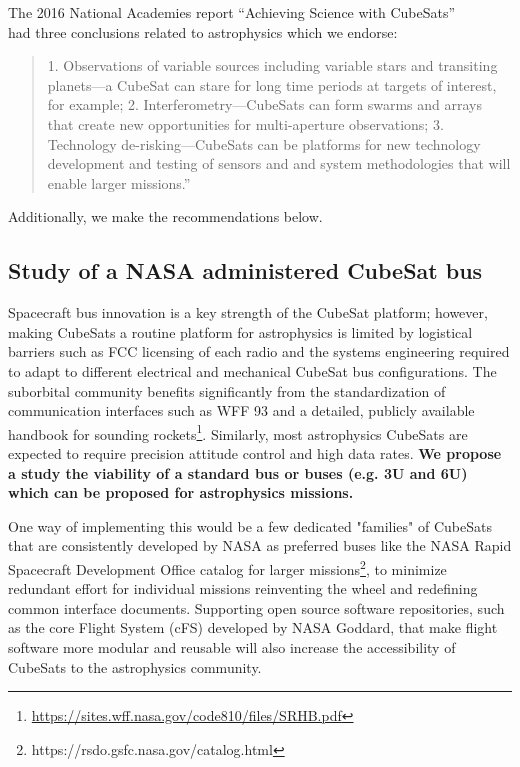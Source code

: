 \documentclass[12pt]{article}
\begin{document}
The 2016 National Academies report ``Achieving Science with CubeSats''\\ \cite{national_academies_of_sciences_achieving_2016}  had three conclusions related to astrophysics which we endorse: 
\begin{quote}
    
1. Observations of variable sources including variable stars and transiting planets—a CubeSat can stare for long time periods at targets of interest, for example; 2. Interferometry—CubeSats can form swarms and arrays that create new opportunities for multi-aperture observations; 3. Technology de-risking—CubeSats can be platforms for new technology development and testing of sensors and and system methodologies that will enable larger missions.''
\end{quote}



Additionally, we make the recommendations below.

\subsection{Study of a NASA administered CubeSat bus}
Spacecraft bus innovation is a key strength of the CubeSat platform; however, making CubeSats a routine platform for astrophysics is limited by logistical barriers such as FCC licensing of each radio and the systems engineering required to adapt to different electrical and mechanical CubeSat bus configurations.  The suborbital community benefits significantly from the standardization of communication interfaces such as WFF 93 and a detailed, publicly available handbook for sounding rockets\footnote{\url{https://sites.wff.nasa.gov/code810/files/SRHB.pdf}}. 
Similarly, most astrophysics CubeSats are expected to require precision attitude control and high data rates.
\textbf{We propose a study the viability of a standard bus or buses (e.g. 3U and 6U) which can be proposed for astrophysics missions.}

One way of implementing this would be a few dedicated "families" of CubeSats that are consistently developed by NASA as preferred buses like the NASA Rapid Spacecraft Development Office catalog for larger missions\footnote{https://rsdo.gsfc.nasa.gov/catalog.html}, to minimize redundant effort for individual missions reinventing the wheel and redefining common interface documents. Supporting open source software repositories, such as the core Flight System (cFS) developed by NASA Goddard, that make flight software more modular and reusable will also increase the accessibility of CubeSats to the astrophysics community.%
\end{document}
